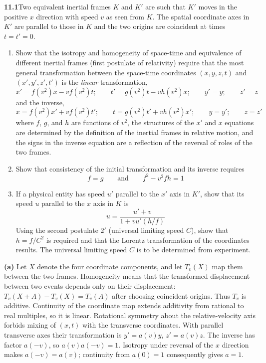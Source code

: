 \par\bigskip
\noindent\textbf{11.1}\quad Two equivalent inertial frames $K$ and $K'$ are such that $K'$ moves in the positive $x$ direction with speed $v$ as seen from $K$. The spatial coordinate axes in $K'$ are parallel to those in $K$ and the two origins are coincident at times $t=t'=0$.
\begin{enumerate}
\item[(a)] Show that the isotropy and homogeneity of space-time and equivalence of different inertial frames (first postulate of relativity) require that the most general transformation between the space-time coordinates $(x,y,z,t)$ and $(x',y',z',t')$ is the \emph{linear} transformation,
\[
x'=f(v^{2})x-vf(v^{2})t;\qquad t'=g(v^{2})t-vh(v^{2})x;\qquad y'=y;\qquad z'=z
\]
and the inverse,
\[
x=f(v^{2})x'+vf(v^{2})t';\qquad t=g(v^{2})t'+vh(v^{2})x';\qquad y=y';\qquad z=z'
\]
where $f$, $g$, and $h$ are functions of $v^{2}$, the structures of the $x'$ and $x$ equations are determined by the definition of the inertial frames in relative motion, and the signs in the inverse equation are a reflection of the reversal of roles of the two frames.
\item[(b)] Show that consistency of the initial transformation and its inverse requires
\[
f=g\qquad\text{and}\qquad f^{2}-v^{2}fh=1
\]
\item[(c)] If a physical entity has speed $u'$ parallel to the $x'$ axis in $K'$, show that its speed $u$ parallel to the $x$ axis in $K$ is
\[
u=\frac{u'+v}{1+vu'(h/f)}
\]
Using the second postulate $2'$ (universal limiting speed $C$), show that $h=f/C^{2}$ is required and that the Lorentz transformation of the coordinates results. The universal limiting speed $C$ is to be determined from experiment.
\end{enumerate}
\solution
\textbf{(a)} Let $X$ denote the four coordinate components, and let
$T_v(X)$ map them between the two frames. Homogeneity means that
the transformed displacement between two events depends only on
their displacement: $T_v(X+A)-T_v(X)=T_v(A)$ after choosing coincident
origins. Thus $T_v$ is additive. Continuity of the coordinate map
extends additivity from rational to real multiples, so it is linear.
Rotational symmetry about the relative-velocity axis forbids mixing
of $(x,t)$ with the transverse coordinates. With parallel transverse
axes their transformation is $y'=a(v)y$, $z'=a(v)z$.
The inverse has factor $a(-v)$, so $a(v)a(-v)=1$. Isotropy under
reversal of the $x$ direction makes $a(-v)=a(v)$; continuity from
$a(0)=1$ consequently gives $a=1$.

